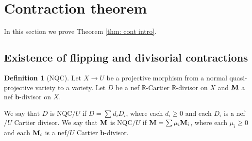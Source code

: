 \documentclass[12pt]{amsart}
\numberwithin{equation}{section}
\newcommand{\bb}{\bm{b}}
\newcommand{\Mm}{{\bf{M}}}
\newcommand{\Rr}{\mathbb{R}}
\theoremstyle{definition}
\newtheorem{defn}[thm]{Definition}
\theoremstyle{definition}
\theoremstyle{definition}
\begin{document}
\section{Contraction theorem}\label{sec: contraction}

In this section we prove Theorem \ref{thm: cont intro}.

\subsection{Existence of flipping and divisorial contractions}

\begin{defn}[NQC]
    Let $X\rightarrow U$ be a projective morphism from a normal quasi-projective variety to a variety. Let $D$ be a nef $\Rr$-Cartier $\Rr$-divisor on $X$ and $\Mm$ a nef $\bb$-divisor on $X$.

    We say that $D$ is NQC$/U$ if $D=\sum d_iD_i$, where each $d_i\geq 0$ and each $D_i$ is a nef$/U$ Cartier divisor. We say that $\Mm$ is NQC$/U$ if $\Mm=\sum \mu_i\Mm_i$, where each $\mu_i\geq 0$ and each $\Mm_i$ is a nef$/U$ Cartier $\bb$-divisor.
\end{defn}
\end{document}
